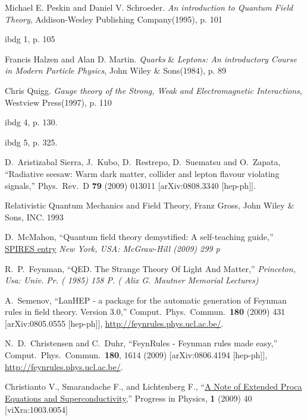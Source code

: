 \begin{thebibliography}{99}
Michael E. Peskin and Daniel V. Schroeder. \emph{An introduction to
Quantum Field Theory}, Addison-Wesley Publishing Company(1995), p.
101

ibdg 1, p. 105

Francis Halzen and Alan D. Martin. \emph{Quarks} \& \emph{Leptons:
An introductory Course in Modern Particle Physics}, John Wiley \&
Sons(1984), p. 89

Chris Quigg. \emph{Gauge theory of the Strong, Weak and
Electromagnetic Interactions}, Westview Press(1997), p. 110


ibdg 4, p. 130.

ibdg 5, p. 325.


  D.~Aristizabal Sierra, J.~Kubo, D.~Restrepo, D.~Suematsu and O.~Zapata,
  ``Radiative seesaw: Warm dark matter, collider and lepton flavour violating
  signals,''
  Phys.\ Rev.\  D {\bf 79} (2009) 013011
  [arXiv:0808.3340 [hep-ph]].

Relativistic Quantum Mechanics and Field Theory, Franz Gross, John Wiley \& Sons, INC. 1993

  D.~McMahon,
  ``Quantum field theory demystified: A self-teaching guide,''
  \href{http://www.slac.stanford.edu/spires/find/hep/www?irn=8432112}{SPIRES entry}
{\it  New York, USA: McGraw-Hill (2009) 299 p}

  R.~P.~Feynman,
  ``QED. The Strange Theory Of Light And Matter,''
{\it  Princeton, Usa: Univ. Pr. ( 1985) 158 P. ( Alix G. Mautner Memorial Lectures)}


  A.~Semenov,
  ``LanHEP - a package for the automatic generation of Feynman rules in field
  theory. Version 3.0,''
  Comput.\ Phys.\ Commun.\  {\bf 180} (2009) 431
  [arXiv:0805.0555 [hep-ph]], \url{http://feynrules.phys.ucl.ac.be/}.

  N.~D.~Christensen and C.~Duhr,
  ``FeynRules - Feynman rules made easy,''
  Comput.\ Phys.\ Commun.\  {\bf 180}, 1614 (2009)
  [arXiv:0806.4194 [hep-ph]],
   \url{http://feynrules.phys.ucl.ac.be/}.

  Christianto V., Smarandache F., and Lichtenberg F., 
  ``\href{http://www.ptep-online.com/index_files/2009/PP-16-08.PDF}{A Note of Extended Proca Equations and Superconductivity,}''
  Progress in Physics, \textbf{1} (2009) 40
  [viXra:1003.0054]


\end{thebibliography}
